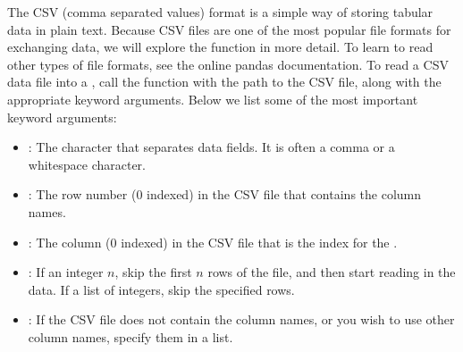 The CSV (comma separated values) format is a simple way of storing tabular data
in plain text.
Because CSV files are one of the most popular file formats for
exchanging data, we will explore the  function in more detail.
To learn to read other types of file formats, see the online pandas
documentation.
To read a CSV data file into a , call the
 function with the path to the CSV file, along with the
appropriate keyword arguments.
Below we list some of the most important keyword
arguments:

\begin{itemize}
\item {}:
The character that separates data fields. It is often a
comma or a whitespace character.
\item {}:
The row number (0 indexed) in the CSV file that contains the column names.
 \item {}:
The column (0 indexed) in the CSV file that is the index for the
.
 \item {}:
If an integer $n$, skip the first $n$ rows of the file, and then start reading
in the data.
If a list of integers, skip the specified rows.
 \item {}:
If the CSV file does not contain the column names, or you wish to use other
column names, specify them in a list.
\end{itemize}

\begin{comment}
\begin{problem}
Write a function \li{prob2()} that accepts a filename.
Check whether the file is in CSV format and read the data in appropriately.
If the file is not in CSV format, raise a \li{TypeError}.


\label{prob:read-csv}
\end{problem}

To save data, pandas has functions that write to several different
file formats.
A typical example is the \li{to_csv()} function method attached to
\li{Series} and \li{DataFrame} objects, which writes the data to a CSV file.
Keyword arguments allow you to specify the separator character, omit writing the
columns names or index, and specify many other options.
The code below
demonstrates its typical usage:
\begin{lstlisting}
>>> df.to_csv("my_df.csv")
\end{lstlisting}
\end{comment}



